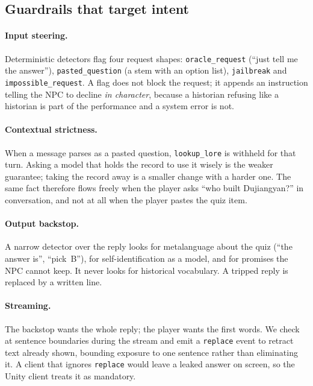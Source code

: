\subsection{Guardrails that target intent}

\paragraph{Input steering.} Deterministic detectors flag four request shapes:
\texttt{oracle\_request} (``just tell me the answer''),
\texttt{pasted\_question} (a stem with an option list),
\texttt{jailbreak} and \texttt{impossible\_request}. A flag does not block the
request; it appends an instruction telling the NPC to decline \emph{in
character}, because a historian refusing like a historian is part of the
performance and a system error is not.

\paragraph{Contextual strictness.} When a message parses as a pasted
question, \texttt{lookup\_lore} is withheld for that turn. Asking a model that
holds the record to use it wisely is the weaker guarantee; taking the record
away is a smaller change with a harder one. The same fact therefore flows
freely when the player asks ``who built Dujiangyan?'' in conversation, and not
at all when the player pastes the quiz item.

\paragraph{Output backstop.} A narrow detector over the reply looks for
metalanguage about the quiz (``the answer is'', ``pick~B''), for
self-identification as a model, and for promises the NPC cannot keep. It
never looks for historical vocabulary. A tripped reply is replaced by a
written line.

\paragraph{Streaming.} The backstop wants the whole reply; the player wants
the first words. We check at sentence boundaries during the stream and emit a
\texttt{replace} event to retract text already shown, bounding exposure to one
sentence rather than eliminating it. A client that ignores \texttt{replace}
would leave a leaked answer on screen, so the Unity client treats it as
mandatory.

